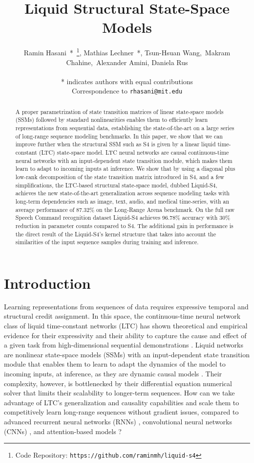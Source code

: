 \documentclass{MITcsail}
\title{Liquid Structural State-Space Models}
\author
{Ramin Hasani~*~\footnote{Code Repository: \texttt{https://github.com/raminmh/liquid-s4}}, Mathias Lechner~*, Tsun-Hsuan Wang,~Makram Chahine,~Alexander Amini, Daniela Rus\\
\vspace{1em} \normalfont{\small 
Computer Science and Artificial Intelligence Lab (CSAIL) \\
Massachusetts Institute of Technology (MIT)\\
Cambridge, 02139, MA} \\
* indicates authors with equal contributions \\
Correspondence to \texttt{rhasani@mit.edu}
\vspace{2em}
}
\begin{document}
\maketitle
\thispagestyle{firstpagestyle} 

\begin{abstract}
A proper parametrization of state transition matrices of linear state-space models (SSMs) followed by standard nonlinearities enables them to efficiently learn representations from sequential data, establishing the state-of-the-art on a large series of long-range sequence modeling benchmarks. In this paper, we show that we can improve further when the structural SSM such as S4 is given by a linear liquid time-constant (LTC) state-space model. LTC neural networks are causal continuous-time neural networks with an input-dependent state transition module, which makes them learn to adapt to incoming inputs at inference. We show that by using a diagonal plus low-rank decomposition of the state transition matrix introduced in S4, and a few simplifications, the LTC-based structural state-space model, dubbed Liquid-S4, achieves the new state-of-the-art generalization across sequence modeling tasks with long-term dependencies such as image, text, audio, and medical time-series, with an average performance of 87.32\% on the Long-Range Arena benchmark. On the full raw Speech Command recognition dataset Liquid-S4 achieves 96.78\% accuracy with 30\% reduction in parameter counts compared to S4. The additional gain in performance is the direct result of the Liquid-S4's kernel structure that takes into account the similarities of the input sequence samples during training and inference.
\end{abstract}

\section{Introduction}

Learning representations from sequences of data requires expressive temporal and structural credit assignment. In this space, the continuous-time neural network class of liquid time-constant networks (LTC) \citep{hasani2021liquid} has shown theoretical and empirical evidence for their expressivity and their ability to capture the cause and effect of a given task from high-dimensional sequential demonstrations \citep{lechner2020neural,vorbach2021causal}. Liquid networks are nonlinear state-space models (SSMs) with an input-dependent state transition module that enables them to learn to adapt the dynamics of the model to incoming inputs, at inference, as they are dynamic causal models \citep{friston2003dynamic}. Their complexity, however, is bottlenecked by their differential equation numerical solver that limits their scalability to longer-term sequences. How can we take advantage of LTC's generalization and causality capabilities and scale them to competitively learn long-range sequences without gradient issues, compared to advanced recurrent neural networks (RNNs) \citep{rusch2021coupled,erichson2021lipschitz,gu2020hippo}, convolutional neural networks (CNNs) \citep{lea2016temporal,romero2021ckconv,cheng2022classification}, and attention-based models \citep{vaswani2017attention}? 
\end{document}
